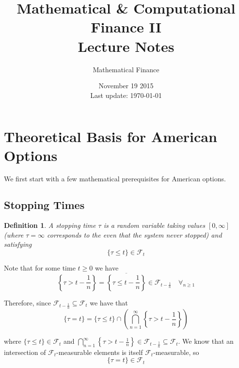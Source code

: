 \documentclass[12pt]{article}
\newtheorem{definition}{Definition}
\begin{document}
 
 
\title{Mathematical \& Computational Finance II\\Lecture Notes}
\author{Mathematical Finance}
\date{November 19 2015 \\ Last update: \today{}}
\maketitle

\section{Theoretical Basis for American Options}

We first start with a few mathematical prerequisites for American options.

\subsection{Stopping Times}

\begin{definition} A stopping time $\tau$ is a random variable taking values $[0, \infty]$ (where $\tau = \infty$ corresponds to the even that the system never stopped) and satisfying
\begin{equation*}
	\{ \tau \leq t \} \in \mathcal F_t
\end{equation*}
\end{definition}

Note that for some time $t \geq 0$ we have
\begin{equation*}
	\left\{\tau > t - \frac{1}{n} \right\} = \overline{ \left\{ \tau \leq t - \frac{1}{n} \right\} } \in \mathcal F_{t - \frac{1}{n}} \quad \forall_{n \geq 1}
\end{equation*}

Therefore, since $\mathcal F_{t - \frac{1}{n}} \subseteq \mathcal F_t$ we have that
\begin{equation*}
	\{ \tau = t \} = \{ \tau \leq t \} \cap \left( \bigcap^\infty_{n = 1} \left\{ \tau > t - \frac{1}{n} \right\} \right)
\end{equation*}

where $\{ \tau \leq t \} \in \mathcal F_t$ and $\bigcap^\infty_{n = 1} \left\{ \tau > t - \frac{1}{n} \right\} \in \mathcal F_{t - \frac{1}{n}} \subseteq \mathcal F_t$. We know that an intersection of $\mathcal F_t$-measurable elements is itself $\mathcal F_t$-measurable, so
\begin{equation*}
	\{ \tau = t \} \in \mathcal F_t
\end{equation*}
\end{document}
